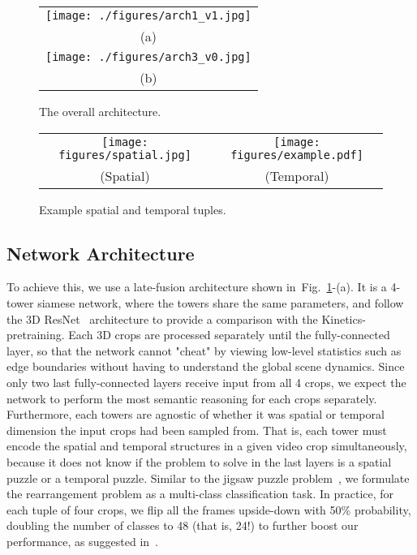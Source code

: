 \documentclass[letterpaper]{article} \usepackage{aaai19}  \usepackage{times}  \usepackage{helvet}  \usepackage{courier}  \usepackage{url}  \usepackage{graphicx}  \frenchspacing  \setlength{\pdfpagewidth}{8.5in}  \setlength{\pdfpageheight}{11in}
\newcommand{\figref}[1]{Fig.~\ref{#1}}
\begin{document}
\begin{figure}
\begin{center}
\def\arraystretch{1.0}
\begin{tabular}{@{}c@{}}

\texttt{[image: ./figures/arch1\_v1.jpg]} \\
(a) \\
\texttt{[image: ./figures/arch3\_v0.jpg]} \\
(b) \\
\end{tabular}
\end{center}
\caption{The overall architecture.}
\label{fig:arch}
\end{figure}


\begin{figure*}
\begin{center}
\def\arraystretch{1.0}
\begin{tabular}{@{}c@{\hskip 0.01\textwidth}c@{}}
\texttt{[image: figures/spatial.jpg]} &
\texttt{[image: figures/example.pdf]} \\
(Spatial) & (Temporal) \\

\end{tabular}
\end{center}
\caption{Example spatial and temporal tuples.}
\label{fig:tuples}
\end{figure*}


\subsection{Network Architecture}
To achieve this, we use a late-fusion architecture shown in~\figref{fig:arch}-(a). It is a 4-tower siamese network, where the towers share the same parameters, and follow the 3D ResNet~\cite{hara2018can} architecture to provide a comparison with the Kinetics-pretraining. Each 3D crops are processed separately until the fully-connected layer, so that the network cannot "cheat" by viewing low-level statistics such as edge boundaries without having to understand the global scene dynamics. Since only two last fully-connected layers receive input from all 4 crops, we expect the network to perform the most semantic reasoning for each crops separately. Furthermore, each towers are agnostic of whether it was spatial or temporal dimension the input crops had been sampled from. That is, each tower must encode the spatial and temporal structures in a given video crop simultaneously, because it does not know if the problem to solve in the last layers is a spatial puzzle or a temporal puzzle. Similar to the jigsaw puzzle problem~\cite{noroozi2016unsupervised}, we formulate the rearrangement problem as a multi-class classification task. In practice, for each tuple of four crops, we flip all the frames upside-down with 50\% probability, doubling the number of classes to 48 (that is, 24!) to further boost our performance, as suggested in~\cite{nathan2018improvements}.
\end{document}
